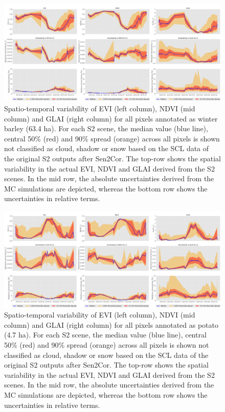 \begin{figure}[H]
    \centering
    \includegraphics[width=\textwidth]{04-Uncertainty/img/Winter Barley_all-pixels-uncertainty-timeseries.png}
    \caption{Spatio-temporal variability of EVI (left column), NDVI (mid column) and GLAI (right column) for all pixels annotated as winter barley (63.4 ha). For each S2 scene, the median value (blue line), central 50\% (red) and 90\% spread (orange) across all pixels is shown not classified as cloud, shadow or snow based on the SCL data of the original S2 outputs after Sen2Cor. The top-row shows the spatial variability in the actual EVI, NDVI and GLAI derived from the S2 scenes. In the mid row, the absolute uncertainties derived from the MC simulations are depicted, whereas the bottom row shows the uncertainties in relative terms.}
    \label{fig:winter-barley-timeseries-and-uncertainty}
\end{figure}

\begin{figure}[H]
    \centering
    \includegraphics[width=\textwidth]{04-Uncertainty/img/Potato_all-pixels-uncertainty-timeseries.png}
    \caption{Spatio-temporal variability of EVI (left column), NDVI (mid column) and GLAI (right column) for all pixels annotated as potato (4.7 ha). For each S2 scene, the median value (blue line), central 50\% (red) and 90\% spread (orange) across all pixels is shown not classified as cloud, shadow or snow based on the SCL data of the original S2 outputs after Sen2Cor. The top-row shows the spatial variability in the actual EVI, NDVI and GLAI derived from the S2 scenes. In the mid row, the absolute uncertainties derived from the MC simulations are depicted, whereas the bottom row shows the uncertainties in relative terms.}
    \label{fig:potato-timeseries-and-uncertainty}
\end{figure}
